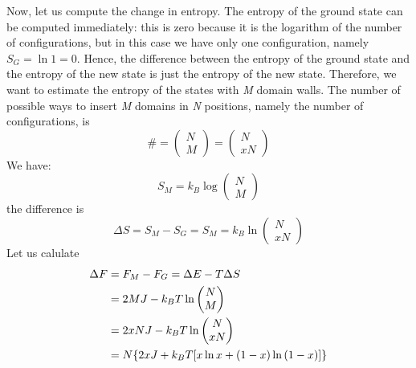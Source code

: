 \documentclass[../main/main.tex]{subfiles}
\begin{document}
Now, let us compute the change in entropy.
The entropy of the ground state can be computed immediately: this is zero because it is the logarithm of the number of configurations, but in this case we have only one configuration, namely  \( S_G = \ln{1} =  0 \). Hence, the difference between the entropy of the ground state and the entropy of the new state is just the entropy of the new state.
Therefore, we want to estimate the entropy of the states with \emph{M} domain walls. 
The number of possible ways to insert \emph{M} domains in \emph{N} positions, namely the number of configurations, is
\begin{equation}
  \# = \begin{pmatrix}
  N \\
  M
  \end{pmatrix} = \begin{pmatrix}
  N \\
  xN
  \end{pmatrix}
\end{equation}
We have:
\begin{equation}
  S_M = k_B \log{\begin{pmatrix}
  N \\
  M
  \end{pmatrix}}
\end{equation}
the difference is
\begin{equation*}
  \Delta S = S_M -S_G = S_M = k_B \ln{\begin{pmatrix}
  N \\
  xN
  \end{pmatrix} }
\end{equation*}
Let us calulate
\begin{equation*}
\begin{split}
\Delta F  &= F_M - F_G = \Delta E - T \Delta S  \\
          &= 2 M J - k_B T \ln{\begin{pmatrix}
          N \\
          M
          \end{pmatrix} } \\
          & = 2xNJ - k_B T \ln{\begin{pmatrix}
          N \\
          xN
          \end{pmatrix} } \\
          & = N \qty{ 2xJ +k_B T \qty[x \ln{x} + (1-x)\ln{(1-x)}  ] }
\end{split}
\end{equation*}
\end{document}
